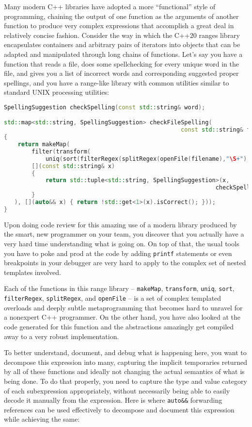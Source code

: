 Many modern C++ libraries have adopted a more ``functional'' style of
programming, chaining the output of one function as the arguments of
another function to produce very complex expressions that accomplish a
great deal in relatively concise fashion. Consider the way in which the
C++20 ranges library encapsulates containers and arbitrary pairs of
iterators into objects that can be adapted and manipulated through long
chains of functions. Let's say you have a function that reads a file,
does some spellchecking for every unique word in the file, and gives you a
list of incorrect words and corresponding suggested proper spellings,
and you have a range-like library with common utilities similar to
standard UNIX processing utilities:

\begin{lstlisting}[language=C++]
SpellingSuggestion checkSpelling(const std::string& word);

std::map<std::string, SpellingSuggestion> checkFileSpelling(
                                                   const std::string& filename)
{
    return makeMap(
        filter(transform(
            uniq(sort(filterRegex(splitRegex(openFile(filename),"\S+"),"\w+")))
        [](const std::string& x)
        {
            return std::tuple<std::string, SpellingSuggestion>(x,
                                                             checkSpelling(x));
        }
   ), [](auto&& x) { return !std::get<1>(x).isCorrect(); }));
}
\end{lstlisting}
    
\noindent Upon doing code review for this amazing use of a modern library produced
by the smart, new programmer on your team, you discover that you actually
have a very hard time understanding what is going on. On top of that,
the usual tools you have to poke and prod at the code by adding
\texttt{printf} statements or even breakpoints in your debugger are very
hard to apply to the complex set of nested templates involved.

Each of the functions in this range library -- \texttt{makeMap},
\texttt{transform}, \texttt{uniq}, \texttt{sort}, \texttt{filterRegex},
\texttt{splitRegex}, and \texttt{openFile} -- is a set of complex
templated overloads and deeply subtle metaprogramming that becomes hard
to unravel for a nonexpert C++ programmer. On the other hand, you have
also looked at the code generated for this function and the abstractions
amazingly get compiled away to a very robust implementation.

To better understand, document, and debug what is happening
here, you want to decompose this expression into many, capturing the
implicit temporaries returned by all of these functions and ideally not
changing the actual semantics of what is being done. To do that
properly, you need to capture the type and value category of each
subexpression appropriately, without necessarily being able to easily
decode it manually from the expression. Here is where \texttt{auto\&\&}
forwarding references can be used effectively to decompose and document
this expression while achieving the same:

